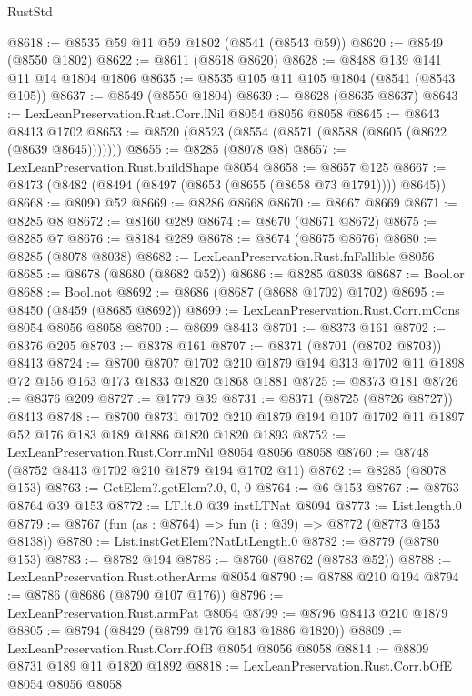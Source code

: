 \begin{lexlean}{RustStd}
\begin{coremodule}
@8618 := @8535 @59 @11 @59 @1802 (@8541 (@8543 @59))
@8620 := @8549 (@8550 @1802)
@8622 := @8611 (@8618 @8620)
@8628 := @8488 @139 @141 @11 @14 @1804 @1806
@8635 := @8535 @105 @11 @105 @1804 (@8541 (@8543 @105))
@8637 := @8549 (@8550 @1804)
@8639 := @8628 (@8635 @8637)
@8643 := LexLeanPreservation.Rust.Corr.lNil @8054 @8056 @8058
@8645 := @8643 @8413 @1702
@8653 := @8520 (@8523 (@8554 (@8571 (@8588 (@8605 (@8622 (@8639 @8645)))))))
@8655 := @8285 (@8078 @8)
@8657 := LexLeanPreservation.Rust.buildShape @8054
@8658 := @8657 @125
@8667 := @8473 (@8482 (@8494 (@8497 (@8653 (@8655 (@8658 @73 @1791)))) @8645))
@8668 := @8090 @52
@8669 := @8286 @8668
@8670 := @8667 @8669
@8671 := @8285 @8
@8672 := @8160 @289
@8674 := @8670 (@8671 @8672)
@8675 := @8285 @7
@8676 := @8184 @289
@8678 := @8674 (@8675 @8676)
@8680 := @8285 (@8078 @8038)
@8682 := LexLeanPreservation.Rust.fnFallible @8056
@8685 := @8678 (@8680 (@8682 @52))
@8686 := @8285 @8038
@8687 := Bool.or
@8688 := Bool.not
@8692 := @8686 (@8687 (@8688 @1702) @1702)
@8695 := @8450 (@8459 (@8685 @8692))
@8699 := LexLeanPreservation.Rust.Corr.mCons @8054 @8056 @8058
@8700 := @8699 @8413
@8701 := @8373 @161
@8702 := @8376 @205
@8703 := @8378 @161
@8707 := @8371 (@8701 (@8702 @8703)) @8413
@8724 := @8700
    @8707
    @1702
    @210
    @1879
    @194
    @313
    @1702
    @11
    @1898
    @72
    @156
    @163
    @173
    @1833
    @1820
    @1868
    @1881
@8725 := @8373 @181
@8726 := @8376 @209
@8727 := @1779 @39
@8731 := @8371 (@8725 (@8726 @8727)) @8413
@8748 := @8700
    @8731
    @1702
    @210
    @1879
    @194
    @107
    @1702
    @11
    @1897
    @52
    @176
    @183
    @189
    @1886
    @1820
    @1820
    @1893
@8752 := LexLeanPreservation.Rust.Corr.mNil @8054 @8056 @8058
@8760 := @8748 (@8752 @8413 @1702 @210 @1879 @194 @1702 @11)
@8762 := @8285 (@8078 @153)
@8763 := GetElem?.getElem?.{0, 0, 0}
@8764 := @6 @153
@8767 := @8763 @8764 @39 @153
@8772 := LT.lt.{0} @39 instLTNat @8094
@8773 := List.length.{0}
@8779 := @8767 (fun (as : @8764) => fun (i : @39) => @8772 (@8773 @153 @8138))
@8780 := List.instGetElem?NatLtLength.{0}
@8782 := @8779 (@8780 @153)
@8783 := @8782 @194
@8786 := @8760 (@8762 (@8783 @52))
@8788 := LexLeanPreservation.Rust.otherArms @8054
@8790 := @8788 @210 @194
@8794 := @8786 (@8686 (@8790 @107 @176))
@8796 := LexLeanPreservation.Rust.armPat @8054
@8799 := @8796 @8413 @210 @1879
@8805 := @8794 (@8429 (@8799 @176 @183 @1886 @1820))
@8809 := LexLeanPreservation.Rust.Corr.fOfB @8054 @8056 @8058
@8814 := @8809 @8731 @189 @11 @1820 @1892
@8818 := LexLeanPreservation.Rust.Corr.bOfE @8054 @8056 @8058

\end{coremodule}
\end{lexlean}

